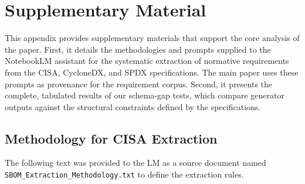\section{Supplementary Material}
\label{app:prompts}

This appendix provides supplementary materials that support the core analysis of the paper. First, it details the methodologies and prompts supplied to the NotebookLM assistant for the systematic extraction of normative requirements from the CISA, CycloneDX, and SPDX specifications. The main paper uses these prompts as provenance for the requirement corpus. Second, it presents the complete, tabulated results of our schema-gap tests, which compare generator outputs against the structural constraints defined by the specifications.
 
\subsection{Methodology for CISA Extraction}

The following text was provided to the LM as a source document named \texttt{SBOM\_Extraction\_Methodology.txt} to define the extraction rules.

